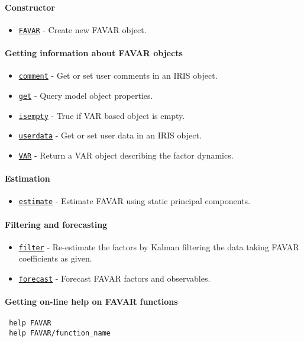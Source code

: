 

	\paragraph{Constructor}
 
 \begin{itemize}
 \item
   \href{FAVAR/FAVAR}{\texttt{FAVAR}} - Create new FAVAR object.
 \end{itemize}
 
 \paragraph{Getting information about FAVAR objects}
 
 \begin{itemize}
 \item
   \href{FAVAR/comment}{\texttt{comment}} - Get or set user comments in
   an IRIS object.
 \item
   \href{FAVAR/get}{\texttt{get}} - Query model object properties.
 \item
   \href{FAVAR/isempty}{\texttt{isempty}} - True if VAR based object is
   empty.
 \item
   \href{FAVAR/userdata}{\texttt{userdata}} - Get or set user data in an
   IRIS object.
 \item
   \href{FAVAR/VAR}{\texttt{VAR}} - Return a VAR object describing the
   factor dynamics.
 \end{itemize}
 
 \paragraph{Estimation}
 
 \begin{itemize}
 \item
   \href{FAVAR/estimate}{\texttt{estimate}} - Estimate FAVAR using static
   principal components.
 \end{itemize}
 
 \paragraph{Filtering and forecasting}
 
 \begin{itemize}
 \item
   \href{FAVAR/filter}{\texttt{filter}} - Re-estimate the factors by
   Kalman filtering the data taking FAVAR coefficients as given.
 \item
   \href{FAVAR/forecast}{\texttt{forecast}} - Forecast FAVAR factors and
   observables.
 \end{itemize}
 
 \paragraph{Getting on-line help on FAVAR functions}
 
 \begin{verbatim}
 help FAVAR
 help FAVAR/function_name
 \end{verbatim}



